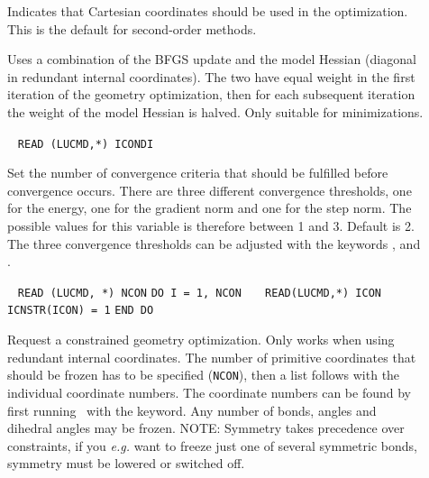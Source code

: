 \begin{description}
\item[]
Indicates that Cartesian coordinates
should be used in the optimization. This is the default for
second-order methods.

\item[]
Uses a combination of the BFGS update and the model Hessian (diagonal
in redundant internal coordinates). The two have equal weight in the
first iteration of the geometry optimization, then for each subsequent
iteration the weight of the model Hessian is halved. Only suitable for
minimizations.

\item[]\verb| |
\newline
\verb|READ (LUCMD,*) ICONDI|

Set the number of convergence criteria
that should be fulfilled before
convergence occurs. There are three different convergence thresholds,
one for the energy, one for the gradient
norm and one for the step
norm.
The possible values for this variable is therefore between 1 and
3. Default is 2. The three convergence thresholds can be adjusted with
the keywords ,  and .

\item[]\verb| |\newline
\verb|READ (LUCMD, *) NCON|\newline
\verb|DO I = 1, NCON|\newline
\verb|   READ(LUCMD,*) ICON|\newline
\verb|   ICNSTR(ICON) = 1|\newline
\verb|END DO|

Request a constrained geometry optimization. Only works when using
redundant internal coordinates. The number of primitive coordinates
that should be frozen has to be specified (\verb|NCON|), then a list
follows with the individual coordinate numbers. The coordinate numbers
can be found by first running \dalton\ with the 
keyword. Any number of bonds, angles and dihedral angles may be
frozen. NOTE: Symmetry takes precedence over constraints, if you
{\it e.g.\/} want to freeze just one of several symmetric bonds, symmetry
must be lowered or switched off.


\end{description}

